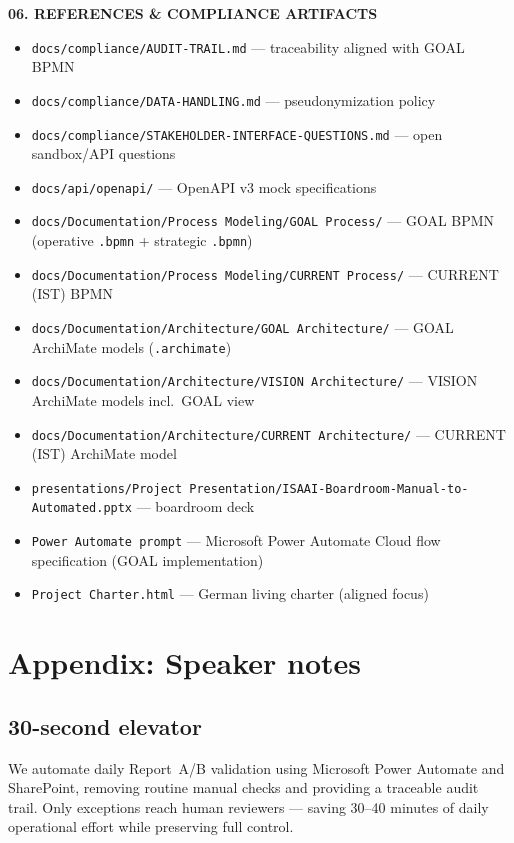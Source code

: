 \documentclass[11pt,a4paper]{article}
\newcommand{\sectiontitle}[1]{%
  \vspace{1.2em}%
  {\color{ISAAIBlue}\bfseries\MakeUppercase{#1}}%
  \vspace{0.4em}\par
}
\begin{document}
\sectiontitle{06. References \& compliance artifacts}

\begin{itemize}[leftmargin=*, nosep]
  \item \texttt{docs/compliance/AUDIT-TRAIL.md} --- traceability aligned with GOAL BPMN
  \item \texttt{docs/compliance/DATA-HANDLING.md} --- pseudonymization policy
  \item \texttt{docs/compliance/STAKEHOLDER-INTERFACE-QUESTIONS.md} --- open sandbox/API questions
  \item \texttt{docs/api/openapi/} --- OpenAPI v3 mock specifications
  \item \texttt{docs/Documentation/Process Modeling/GOAL Process/} --- GOAL BPMN (operative \texttt{.bpmn} + strategic \texttt{.bpmn})
  \item \texttt{docs/Documentation/Process Modeling/CURRENT Process/} --- CURRENT (IST) BPMN
  \item \texttt{docs/Documentation/Architecture/GOAL Architecture/} --- GOAL ArchiMate models (\texttt{.archimate})
  \item \texttt{docs/Documentation/Architecture/VISION Architecture/} --- VISION ArchiMate models incl.\ GOAL view
  \item \texttt{docs/Documentation/Architecture/CURRENT Architecture/} --- CURRENT (IST) ArchiMate model
  \item \texttt{presentations/Project Presentation/ISAAI-Boardroom-Manual-to-Automated.pptx} --- boardroom deck
  \item \texttt{Power Automate prompt} --- Microsoft Power Automate Cloud flow specification (GOAL implementation)
  \item \texttt{Project Charter.html} --- German living charter (aligned focus)
\end{itemize}
\clearpage
\section*{Appendix: Speaker notes}
\subsection*{30-second elevator}
We automate daily Report~A/B validation using Microsoft Power Automate and SharePoint, removing routine manual checks and providing a traceable audit trail. Only exceptions reach human reviewers --- saving 30--40 minutes of daily operational effort while preserving full control.
\end{document}
